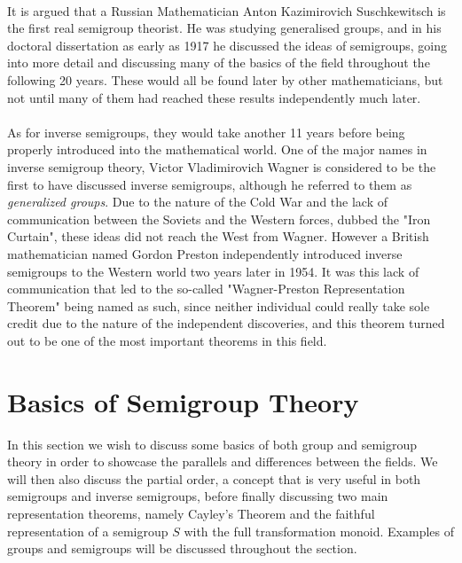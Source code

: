 \documentclass[12pt]{article}
\begin{document}
\\It is argued that a Russian Mathematician Anton Kazimirovich Suschkewitsch is the first real semigroup theorist\cite{2}. He was studying generalised groups, and in his doctoral dissertation as early as 1917 he discussed the ideas of semigroups, going into more detail and discussing many of the basics of the field throughout the following 20 years.\cite{2} These would all be found later by other mathematicians, but not until many of them had reached these results independently much later.\\
\\As for inverse semigroups, they would take another 11 years before being properly introduced into the mathematical world. One of the major names in inverse semigroup theory, Victor Vladimirovich Wagner is considered to be the first to have discussed inverse semigroups, although he referred to them as \textit{generalized groups}\cite{5}. Due to the nature of the Cold War and the lack of communication between the Soviets and the Western forces, dubbed the "Iron Curtain", these ideas did not reach the West from Wagner. However a British mathematician named Gordon Preston independently introduced inverse semigroups to the Western world two years later in 1954\cite{2}. It was this lack of communication that led to the so-called "Wagner-Preston Representation Theorem" being named as such, since neither individual could really take sole credit due to the nature of the independent discoveries, and this theorem turned out to be one of the most important theorems in this field.\\

\section{Basics of Semigroup Theory}
In this section we wish to discuss some basics of both group and semigroup theory in order to showcase the parallels and differences between the fields. We will then also discuss the partial order, a concept that is very useful in both semigroups and inverse semigroups, before finally discussing two main representation theorems, namely Cayley's Theorem and the faithful representation of a semigroup $S$ with the full transformation monoid. Examples of groups and semigroups will be discussed throughout the section.
\end{document}
